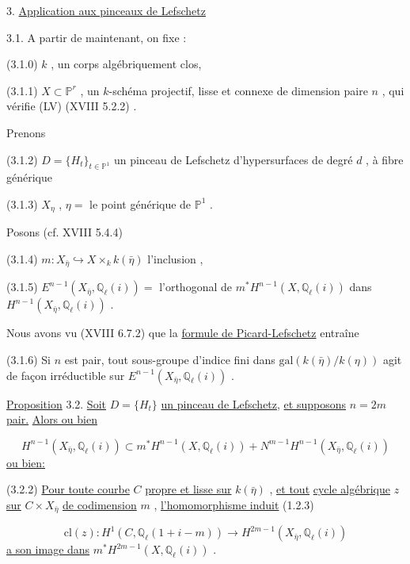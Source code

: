 

3. \underline{Application aux pinceaux de Lefschetz}

3.1. \quad A partir de maintenant, on fixe :

(3.1.0) $k$ , un corps algébriquement clos,

(3.1.1) $X \subset \mathbb{P}^{r}$ , un $k$-schéma projectif, lisse et connexe de dimension paire $n$ , qui vérifie (LV) (XVIII 5.2.2) .

Prenons

(3.1.2) $D = \{H_{t}\}_{t \in \mathbb{P}^{1}}$ un pinceau de Lefschetz d'hypersurfaces de degré $d$ , à fibre générique

(3.1.3) $X_{\eta}$ , $\eta =$ le point générique de $\mathbb{P}^{1}$ .

Posons (cf. XVIII 5.4.4)

(3.1.4) $m : X_{\bar{\eta}} \hookrightarrow X \times_{k} k(\bar{\eta})$ l'inclusion ,

(3.1.5) $E^{n-1}(X_{\bar{\eta}}, \mathbb{Q}_{\ell}(i)) =$ l'orthogonal de $m^{*}H^{n-1}(X,\mathbb{Q}_{\ell}(i))$ dans $H^{n-1}(X_{\bar{\eta}},\mathbb{Q}_{\ell}(i))$ .

Nous avons vu (XVIII 6.7.2) que la \underline{formule de Picard-Lefschetz} entraîne

(3.1.6) Si $n$ est pair, tout sous-groupe d'indice fini dans $\mathrm{gal}(k(\bar{\eta})/k(\eta))$ agit de façon irréductible sur $E^{n-1}(X_{\bar{\eta}},\mathbb{Q}_{\ell}(i))$ .

\underline{Proposition} 3.2. \quad \underline{Soit} $D = \{H_{t}\}$ \underline{un pinceau de Lefschetz}, \underline{et supposons} $n = 2m$ \underline{pair.} \underline{Alors ou bien} 



\begin{equation}\tag{3.2.1}
 H^{n-1}(X_{\bar{\eta}},\mathbb{Q}_{\ell}(i)) \subset m^{*}H^{n-1}(X,\mathbb{Q}_{\ell}(i)) + N^{m-1}H^{n-1}(X_{\bar{\eta}},\mathbb{Q}_{\ell}(i))
\end{equation}
\underline{ou bien:}

(3.2.2) \underline{Pour toute courbe} $C$ \underline{propre et lisse sur} $k(\bar{\eta})$ , \underline{et tout} \underline{cycle algébrique} $z$ \underline{sur} $C \times X_{\bar{\eta}}$ \underline{de codimension} $m$ , \underline{l'homomorphisme induit} (1.2.3)

\begin{equation}\tag{3.2.3}
\mathrm{cl}(z) : H^{1}(C, \mathbb{Q}_{\ell}(1+i-m)) \longrightarrow H^{2m-1}(X_{\bar{\eta}},\mathbb{Q}_{\ell}(i))
\end{equation}
\underline{a son image dans} $m^{*}H^{2m-1}(X,\mathbb{Q}_{\ell}(i))$ .


